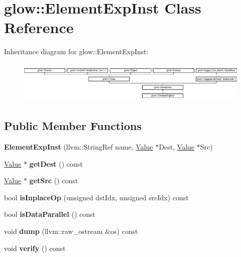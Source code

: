\hypertarget{classglow_1_1_element_exp_inst}{}\section{glow\+:\+:Element\+Exp\+Inst Class Reference}
\label{classglow_1_1_element_exp_inst}
Inheritance diagram for glow\+:\+:Element\+Exp\+Inst\+:\begin{figure}[H]
\begin{center}
\leavevmode
\includegraphics[height=1.991111cm]{classglow_1_1_element_exp_inst}
\end{center}
\end{figure}
\subsection*{Public Member Functions}
\begin{DoxyCompactItemize}
\item 
\mbox{\label{classglow_1_1_element_exp_inst_aa42c333dc4c9af203ebfa2e39690d6e8}} 
{\bfseries Element\+Exp\+Inst} (llvm\+::\+String\+Ref name, \hyperlink{classglow_1_1_value}{Value} $\ast$Dest, \hyperlink{classglow_1_1_value}{Value} $\ast$Src)
\item 
\mbox{\label{classglow_1_1_element_exp_inst_aa3645bf46e6f60aab2f5d71c012e9f49}} 
\hyperlink{classglow_1_1_value}{Value} $\ast$ {\bfseries get\+Dest} () const
\item 
\mbox{\label{classglow_1_1_element_exp_inst_a6555e9536d0cfa426dc5119065037a51}} 
\hyperlink{classglow_1_1_value}{Value} $\ast$ {\bfseries get\+Src} () const
\item 
\mbox{\label{classglow_1_1_element_exp_inst_a74b9c6e7ec57d962c4705a0592f5a549}} 
bool {\bfseries is\+Inplace\+Op} (unsigned dst\+Idx, unsigned src\+Idx) const
\item 
\mbox{\label{classglow_1_1_element_exp_inst_af8fe4a0a3143bc409c53e4c352e922ef}} 
bool {\bfseries is\+Data\+Parallel} () const
\item 
\mbox{\label{classglow_1_1_element_exp_inst_addefd6c401e090be8c4322e709788afb}} 
void {\bfseries dump} (llvm\+::raw\+\_\+ostream \&os) const
\item 
\mbox{\label{classglow_1_1_element_exp_inst_ab216712c3c5f217facfe67c46b92ee2a}} 
void {\bfseries verify} () const
\end{DoxyCompactItemize}
